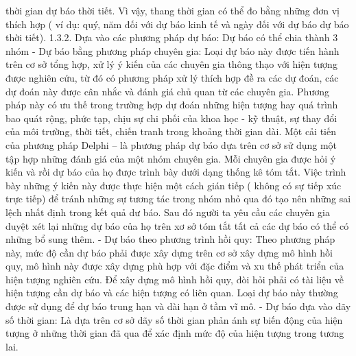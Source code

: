 thời gian dự báo thời tiết. Vì vậy, thang thời gian có thể đo bằng những đơn vị thích hợp ( ví dụ: quý, năm đối với dự báo kinh tế và ngày đối với dự báo dự báo thời tiết).
1.3.2. Dựa vào các phương pháp dự báo: Dự báo có thể chia thành 3 nhóm
- Dự báo bằng phương pháp chuyên gia: Loại dự báo này được tiến hành trên cơ sở tổng hợp, xử lý ý kiến của các chuyên gia thông thạo với hiện tượng được nghiên cứu, từ đó có phương pháp xử lý thích hợp đề ra các dự đoán, các dự đoán này được cân nhắc và đánh giá chủ quan từ các chuyên gia. Phương pháp này có ưu thế trong trường hợp dự đoán những hiện tượng hay quá trình bao quát rộng, phức tạp, chịu sự chi phối của khoa học - kỹ thuật, sự thay đổi của môi trường, thời tiết, chiến tranh trong khoảng thời gian dài. Một cải tiến của phương pháp Delphi – là phương pháp dự báo dựa trên cơ sở sử dụng một tập hợp những đánh giá của một nhóm chuyên gia. Mỗi chuyên gia được hỏi ý kiến và rồi dự báo của họ được trình bày dưới dạng thống kê tóm tắt. Việc trình bày những ý kiến này được thực hiện một cách gián tiếp ( không có sự tiếp xúc trực tiếp) để tránh những sự tương tác trong nhóm nhỏ qua đó tạo nên những sai lệch nhất định trong kết quả dư báo. Sau đó người ta yêu cầu các chuyên gia duyệt xét lại những dự báo của họ trên xơ sở tóm tắt tất cả các dự báo có thể có những bổ sung thêm.
- Dự báo theo phương trình hồi quy: Theo phương pháp này, mức độ cần dự báo phải được xây dựng trên cơ sở xây dựng mô hình hồi quy, mô hình này được xây dựng phù hợp với đặc điểm và xu thế phát triển của hiện tượng nghiên cứu. Để xây dựng mô hình hồi quy, đòi hỏi phải có tài liệu về hiện tượng cần dự báo và các hiện tượng có liên quan. Loại dự báo này thường được sử dụng để dự báo trung hạn và dài hạn ở tầm vĩ mô.
- Dự báo dựa vào dãy số thời gian: Là dựa trên cơ sở dãy số thời gian phản ánh sự biến động của hiện tượng ở những thời gian đã qua để xác định mức độ của hiện tượng trong tương lai.
